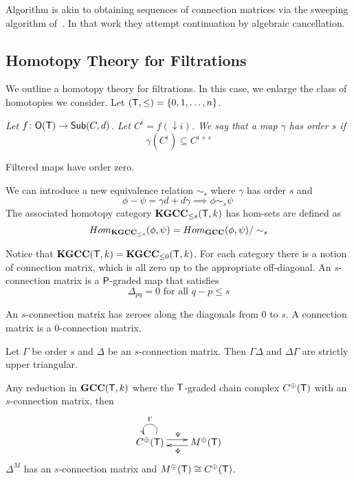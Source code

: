 \begin{rem}
Algorithm is akin to obtaining sequences of connection matrices via the sweeping algorithm of~\cite{}.    In that work they attempt continuation by algebraic cancellation.
\end{rem}


\subsection{Homotopy Theory for Filtrations}

We outline a homotopy theory for filtrations.  In this case, we enlarge the class of homotopies we consider.   Let $({\mathsf T},\leq) = \{0,1,\ldots,n\}$.

\begin{defn}
{\em
Let $f\colon {\mathsf O}({\mathsf T}) \to \mathsf{Sub}(C,d)$. Let $C^i=f(\downarrow i)$. We say that a map $\gamma$ has order $s$ if
\[
\gamma(C^i)\subseteq C^{i+s}
\]

}
\end{defn}
\begin{rem}
Filtered maps have order zero.
\end{rem}


We can introduce a new equivalence relation $\sim_s$ where $\gamma$ has order $s$ and
\[
\phi-\psi = \gamma d+d\gamma\implies \phi\sim_s \psi \
\]  
The associated homotopy category ${\bf KGCC}_{\leq s}({\mathsf T},k)$ has hom-sets are defined as
\[
Hom_{{\bf KGCC}_{\leq s}}(\phi,\psi) = Hom_{{\bf GCC}}(\phi ,\psi )/\sim_s
\]

Notice that ${\bf KGCC}({\mathsf T},k) = {\bf KGCC}_{\leq 0}({\mathsf T} ,k)$.   For each category there is a notion of connection matrix, which is all zero up to the appropriate off-diagonal.  An $s$-connection matrix is a ${\mathsf P}$-graded map that satisfies 
\[
\Delta_{pq} = 0 \text{ for all } q-p\leq s
\]

An $s$-connection matrix has zeroes along the diagonals from $0$ to $s$.  A connection matrix is a $0$-connection matrix.


\begin{prop}
Let $\Gamma$ be order $s$ and $\Delta$ be an $s$-connection matrix.  Then $\Gamma\Delta$ and $\Delta\Gamma$ are strictly upper triangular.
\end{prop}



\begin{prop}
  Any reduction in ${\bf GCC} ({\mathsf T},k)$ where the ${\mathsf T}$-graded chain complex $C^\oplus({\mathsf T})$ with an $s$-connection matrix, then
 \[
\xymatrixrowsep{0.03in}
\xymatrixcolsep{0.3in}
\xymatrix{
C^\oplus(\sT) \ar@(ur,ul)_{\Gamma}  \ar[r]<3pt>^{\Psi} & \ar[l]<3pt>^{\Phi} M^\oplus(\sT) 
}
\]
 $\Delta^M$ has an $s$-connection matrix and $M^\oplus({\mathsf T})\cong C^\oplus({\mathsf T})$.
\end{prop}


